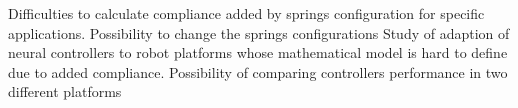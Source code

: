 Difficulties to calculate compliance added by springs configuration for specific applications.
Possibility to change the springs configurations
Study of adaption of neural controllers to robot platforms whose mathematical model is hard to define due to added compliance.
Possibility of comparing controllers performance in two different platforms
